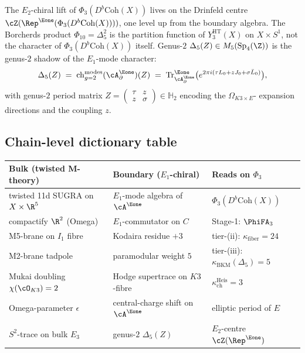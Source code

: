 \begin{remark}
\label{rem:agent12-E2-data-hides-centre}
The $E_2$-chiral lift of $\Phi_3(D^b\mathrm{Coh}(X))$ lives on the
Drinfeld centre $\cZ(\Rep^{\Eone}(\Phi_3(D^b\mathrm{Coh}(X))))$, one
level up from the boundary algebra. The Borcherds product
$\Phi_{10} = \Delta_5^2$ is the partition function of
$Y^{\mathrm{HT}}_3(X)$ on $X \times S^1$, not the character of
$\Phi_3(D^b\mathrm{Coh}(X))$ itself. Genus-$2$ $\Delta_5(Z) \in
M_5(\mathrm{Sp}_4(\Z))$ is the genus-$2$ shadow of the $E_1$-mode
character:
\[
 \Delta_5(Z)
 \;=\;
 \mathrm{ch}^{\mathrm{modes}}_{g=2}(\cA^{\Eone}_\partial)(Z)
 \;=\;
 \mathrm{Tr}^{\Eone}_{\cA^{\Eone}_\partial}\bigl(
 e^{2\pi i(\tau L_0 + z J_0 + \sigma \bar L_0)}\bigr),
\]
with genus-$2$ period matrix $Z = \begin{pmatrix} \tau & z\\ z & \sigma
\end{pmatrix} \in \mathbb{H}_2$ encoding the $\Omega_{K3 \times E}$-
expansion directions and the coupling $z$.
\end{remark}

\subsection*{Chain-level dictionary table}

\begin{center}
\small
\begin{tabular}{lll}
\toprule
Bulk (twisted M-theory) & Boundary ($E_1$-chiral) & Reads on $\Phi_3$ \\
\midrule
twisted 11d SUGRA on $X \times \R^5$ & $E_1$-mode algebra of $\cA^{\Eone}$ & $\Phi_3(D^b\mathrm{Coh}(X))$ \\
compactify $\R^2$ (Omega) & $E_1$-commutator on $C$ & Stage-1: $\PhiFA_3$ \\
M5-brane on $I_1$ fibre & Kodaira residue $+3$ & tier-(ii): $\kappa_{\mathrm{fiber}} = 24$ \\
M2-brane tadpole & paramodular weight $5$ & tier-(iii): $\kappa_{\mathrm{BKM}}(\Delta_5) = 5$ \\
Mukai doubling $\chi(\cO_{K3}) = 2$ & Hodge supertrace on $K3$-fibre & $\kappa_{\mathrm{ch}}^{\mathrm{Heis}} = 3$ \\
Omega-parameter $\epsilon$ & central-charge shift on $\cA^{\Eone}$ & elliptic period of $E$ \\
$S^2$-trace on bulk $E_3$ & genus-$2$ $\Delta_5(Z)$ & $E_2$-centre $\cZ(\Rep^{\Eone})$ \\
\bottomrule
\end{tabular}
\end{center}

